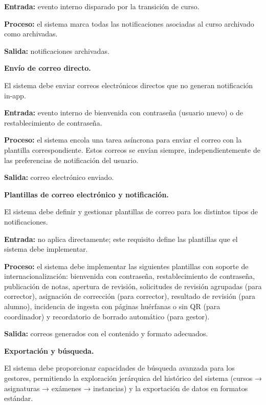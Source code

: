 \begin{functional}
\begin{functional}
    \textbf{Entrada:} evento interno disparado por la transición de curso.

    \textbf{Proceso:} el sistema marca todas las notificaciones asociadas al curso archivado como archivadas.

    \textbf{Salida:} notificaciones archivadas.

    \item \textbf{Envío de correo directo.}

    El sistema debe enviar correos electrónicos directos que no generan notificación in-app.

    \textbf{Entrada:} evento interno de bienvenida con contraseña (usuario nuevo) o de restablecimiento de contraseña.

    \textbf{Proceso:} el sistema encola una tarea asíncrona para enviar el correo con la plantilla correspondiente. Estos correos se envían siempre, independientemente de las preferencias de notificación del usuario.

    \textbf{Salida:} correo electrónico enviado.

    \item \textbf{Plantillas de correo electrónico y notificación.}

    El sistema debe definir y gestionar plantillas de correo para los distintos tipos de notificaciones.

    \textbf{Entrada:} no aplica directamente; este requisito define las plantillas que el sistema debe implementar.

    \textbf{Proceso:} el sistema debe implementar las siguientes plantillas con soporte de internacionalización: bienvenida con contraseña, restablecimiento de contraseña, publicación de notas, apertura de revisión, solicitudes de revisión agrupadas (para corrector), asignación de corrección (para corrector), resultado de revisión (para alumno), incidencia de ingesta con páginas huérfanas o sin QR (para coordinador) y recordatorio de borrado automático (para gestor).

    \textbf{Salida:} correos generados con el contenido y formato adecuados.

  \end{functional}

  \item \textbf{Exportación y búsqueda.}

  El sistema debe proporcionar capacidades de búsqueda avanzada para los gestores, permitiendo la exploración jerárquica del histórico del sistema (cursos → asignaturas → exámenes → instancias) y la exportación de datos en formatos estándar.


\end{functional}
